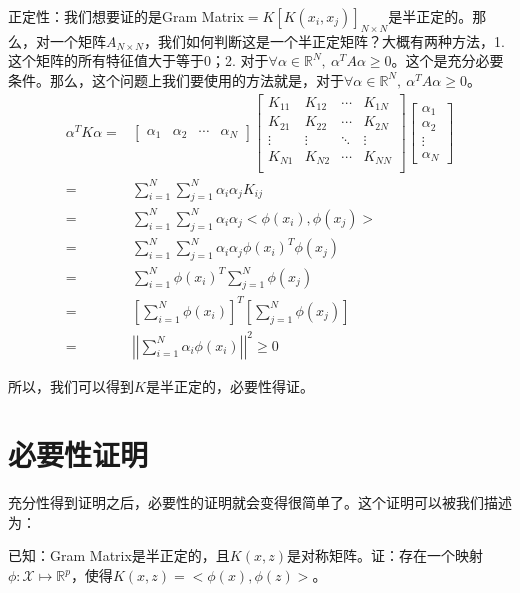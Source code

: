\documentclass[a4paper]{article}
\begin{document}
正定性：我们想要证的是Gram Matrix$=K[K(x_i,x_j)]_{N\times N}$是半正定的。那么，对一个矩阵$A_{N\times N}$，我们如何判断这是一个半正定矩阵？大概有两种方法，1. 这个矩阵的所有特征值大于等于0；2. 对于$\forall \alpha \in \mathbb{R}^N,\ \alpha^T A \alpha \geq 0$。这个是充分必要条件。那么，这个问题上我们要使用的方法就是，对于$\forall \alpha \in \mathbb{R}^N,\ \alpha^T A \alpha \geq 0$。
\begin{align}
    \alpha^TK\alpha = & 
    \begin{bmatrix}
        \alpha_1 & \alpha_2 & \cdots & \alpha_N
    \end{bmatrix}
    \begin{bmatrix}
        K_{11} & K_{12} & \cdots & K_{1N} \\
        K_{21} & K_{22} & \cdots & K_{2N} \\
        \vdots & \vdots & \ddots & \vdots \\
        K_{N1} & K_{N2} & \cdots & K_{NN} \\
    \end{bmatrix}
    \begin{bmatrix}
        \alpha_1 \\
        \alpha_2 \\ 
        \vdots \\ 
        \alpha_N
    \end{bmatrix} \\
    = & \sum_{i=1}^N\sum_{j=1}^N \alpha_i\alpha_jK_{ij} \\
    = & \sum_{i=1}^N\sum_{j=1}^N \alpha_i\alpha_j<\phi(x_i),\phi(x_j)> \\
    = & \sum_{i=1}^N\sum_{j=1}^N \alpha_i\alpha_j\phi(x_i)^T\phi(x_j) \\ 
    = & \sum_{i=1}^N\phi(x_i)^T\sum_{j=1}^N\phi(x_j) \\
    = & \left[  \sum_{i=1}^N\phi(x_i) \right]^T \left[  \sum_{j=1}^N\phi(x_j) \right] \\
    = & \left|\left| \sum_{i=1}^N \alpha_i\phi(x_i) \right|\right|^2 \geq 0
\end{align}

所以，我们可以得到$K$是半正定的，必要性得证。

\section{必要性证明}
充分性得到证明之后，必要性的证明就会变得很简单了。这个证明可以被我们描述为：

已知：Gram Matrix是半正定的，且$K(x,z)$是对称矩阵。证：存在一个映射$\phi:\mathcal{X}\mapsto\mathbb{R}^p$，使得$K(x,z) = <\phi(x),\phi(z)>$。
\end{document}
